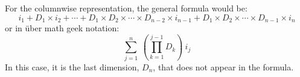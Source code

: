 For the columnwise representation, the general formula would be:
\begin{displaymath}
i_1 + D_1 \times i_2 + \cdots + D_1 \times D_2 \times \cdots \times D_{n-2} 
\times i_{n-1} + D_1 \times D_2 \times \cdots \times D_{n-1} \times i_n
\end{displaymath}
or in \"{u}ber math geek notation:
\begin{displaymath}
\sum_{j=1}^{n} \: \left( \prod_{k=1}^{j-1} D_k \right) \: i_j
\end{displaymath}
In this case, it is the last dimension, $D_n$, that does not appear in the
formula.
%
%
%
%

